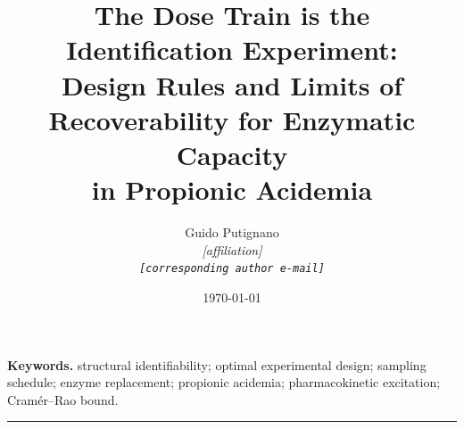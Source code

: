 

\title{\textbf{The Dose Train is the Identification Experiment:\\
Design Rules and Limits of Recoverability for Enzymatic Capacity\\
in Propionic Acidemia}}
\author{Guido Putignano\\[2pt]
  \normalsize\itshape \textnormal{[affiliation]}\\
  \normalsize\texttt{[corresponding author e-mail]}}
\date{\today}


\maketitle



\vspace{0.6em}
\noindent\textbf{Keywords.} structural identifiability; optimal experimental
design; sampling schedule; enzyme replacement; propionic acidemia; pharmacokinetic
excitation; Cram\'er--Rao bound.

\vspace{0.5em}\hrule\vspace{1.5em}



\clearpage



\clearpage




